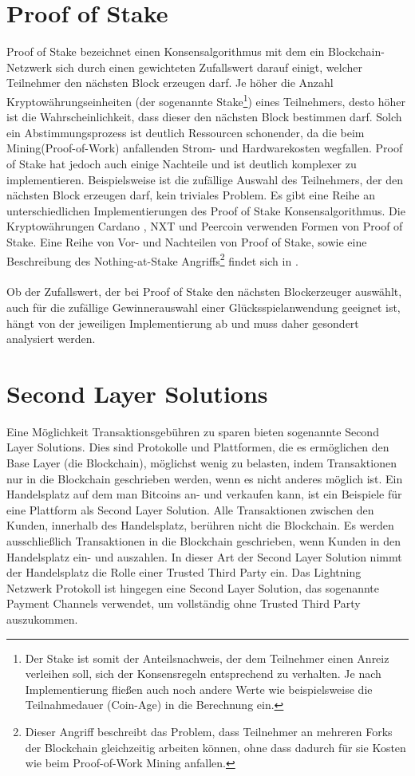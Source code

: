 \section{Proof of Stake }\label{pos}
Proof of Stake bezeichnet einen Konsensalgorithmus mit dem ein Blockchain-Netzwerk sich durch einen gewichteten Zufallswert darauf einigt, welcher Teilnehmer den nächsten Block erzeugen darf. Je höher die Anzahl Kryptowährungseinheiten (der sogenannte Stake\footnote{Der Stake ist somit der Anteilsnachweis, der dem Teilnehmer einen Anreiz verleihen soll, sich der Konsensregeln entsprechend zu verhalten. Je nach Implementierung fließen auch noch andere Werte wie beispielsweise die Teilnahmedauer (Coin-Age) in die Berechnung ein.}) eines Teilnehmers, desto höher ist die Wahrscheinlichkeit, dass dieser den nächsten Block bestimmen darf. Solch ein Abstimmungsprozess ist deutlich Ressourcen schonender, da die beim Mining(Proof-of-Work) anfallenden Strom- und Hardwarekosten wegfallen. Proof of Stake hat jedoch auch einige Nachteile und ist deutlich komplexer zu implementieren. Beispielsweise ist die zufällige Auswahl des Teilnehmers, der den nächsten Block erzeugen darf, kein triviales Problem. Es gibt eine Reihe an unterschiedlichen Implementierungen des Proof of Stake Konsensalgorithmus. Die Kryptowährungen Cardano \cite{coin_ada}, NXT \cite{coin_nxt} und Peercoin \cite{coin_peercoin} verwenden Formen von Proof of Stake. Eine Reihe von Vor- und Nachteilen von Proof of Stake, sowie eine Beschreibung des Nothing-at-Stake Angriffs\footnote{Dieser Angriff beschreibt das Problem, dass Teilnehmer an mehreren Forks der Blockchain gleichzeitig arbeiten können, ohne dass dadurch für sie Kosten wie beim Proof-of-Work Mining anfallen.} findet sich in \cite{proof_of_stake}.\\\\
Ob der Zufallswert, der bei Proof of Stake den nächsten Blockerzeuger auswählt, auch für die zufällige Gewinnerauswahl einer Glücksspielanwendung geeignet ist, hängt von der jeweiligen Implementierung ab und muss daher gesondert analysiert werden.

\section{Second Layer Solutions}
Eine Möglichkeit Transaktionsgebühren zu sparen bieten sogenannte Second Layer Solutions. Dies sind Protokolle und Plattformen, die es ermöglichen den Base Layer (die Blockchain), möglichst wenig zu belasten, indem Transaktionen nur in die Blockchain geschrieben werden, wenn es nicht anderes möglich ist. Ein Handelsplatz auf dem man Bitcoins an- und verkaufen kann, ist ein Beispiele für eine Plattform als Second Layer Solution. Alle Transaktionen zwischen den Kunden, innerhalb des Handelsplatz, berühren nicht die Blockchain. Es werden ausschließlich Transaktionen in die Blockchain geschrieben, wenn Kunden in den Handelsplatz ein- und auszahlen. In dieser Art der Second Layer Solution nimmt der Handelsplatz die Rolle einer Trusted Third Party ein. Das Lightning Netzwerk Protokoll ist hingegen eine Second Layer Solution, das sogenannte Payment Channels verwendet, um vollständig ohne Trusted Third Party auszukommen.

